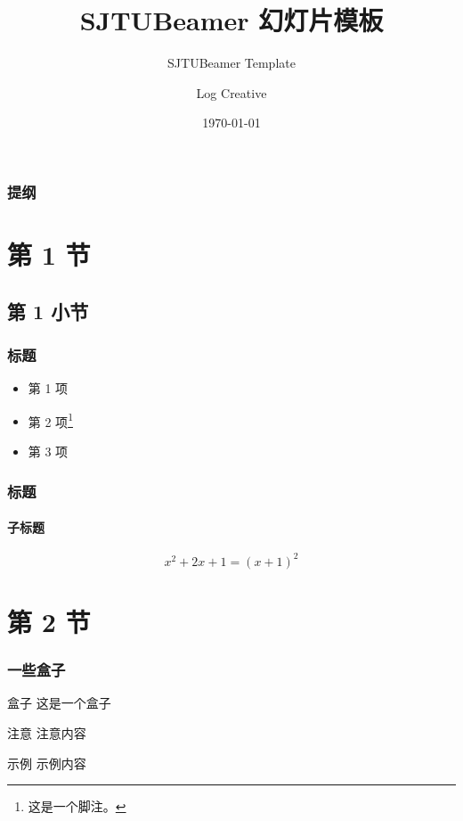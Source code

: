 \documentclass[
]{beamer}
\title{\textsf{SJTUBeamer} 幻灯片模板}  %
\subtitle{SJTUBeamer Template}         %
\author{Log Creative}                  %
\institute[School of Foreign Languages]{外国语学院}   %
\date{\today}                          %
\begin{document}
    \maketitle                         %

    \begin{frame}
        \frametitle{提纲}
        \tableofcontents               %
    \end{frame}

\section{第 1 节}
\subsection{第 1 小节}
    \begin{frame}
        \frametitle{标题}

        \begin{itemize}
            \item 第 1 项
            \item 第 2 项\footnote{这是一个脚注。}
            \item 第 3 项
        \end{itemize}

    \end{frame}

    \begin{frame}
        \frametitle{标题}
        \framesubtitle{子标题}

        \begin{equation}
            x^2+2x+1=(x+1)^2
        \end{equation}
        
    \end{frame}

\section{第 2 节}
    \begin{frame}
        \frametitle{一些盒子}
        
        \begin{block}{盒子}
            这是一个盒子
        \end{block}

        \begin{alertblock}{注意}
            注意内容
        \end{alertblock}

        \begin{exampleblock}{示例}
            示例内容
        \end{exampleblock}
    \end{frame}
\end{document}
